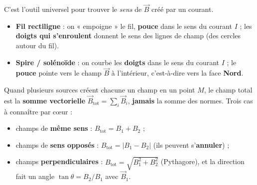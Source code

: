 \documentclass[11pt,a4paper]{article}
\newcommand{\vv}[1]{\vec{#1}}\newcommand{\ds}{\displaystyle}
\begin{document}
\begin{methode}
C'est l'outil universel pour trouver le \emph{sens} de $\vv{B}$ créé par un courant.
\begin{itemize}[leftmargin=1.5em,topsep=1pt,itemsep=1pt]
  \item \textbf{Fil rectiligne} : on « empoigne » le fil, \textbf{pouce} dans le sens du courant $I$ ;
        les \textbf{doigts qui s'enroulent} donnent le sens des lignes de champ (des cercles autour
        du fil).
  \item \textbf{Spire / solénoïde} : on courbe les \textbf{doigts} dans le sens du courant $I$ ;
        le \textbf{pouce} pointe vers le champ $\vv{B}$ à l'intérieur, c'est-à-dire vers la face
        \textbf{Nord}.
\end{itemize}
\begin{center}
\end{center}
\end{methode}

\begin{piege}
Quand plusieurs sources créent chacune un champ en un point $M$, le champ total est la
\textbf{somme vectorielle} $\vv{B}_{\text{tot}}=\sum_i \vv{B}_i$, \textbf{jamais} la somme des normes.
Trois cas à connaître par cœur :
\begin{itemize}[leftmargin=1.5em,topsep=1pt,itemsep=0pt]
  \item champs de \textbf{même sens} : $B_{\text{tot}}=B_1+B_2$ ;
  \item champs de \textbf{sens opposés} : $B_{\text{tot}}=|B_1-B_2|$ (ils peuvent s'\textbf{annuler}) ;
  \item champs \textbf{perpendiculaires} : $B_{\text{tot}}=\sqrt{B_1^{2}+B_2^{2}}$ (Pythagore),
        et la direction fait un angle $\tan\theta=B_2/B_1$ avec $\vv{B}_1$.
\end{itemize}
\end{piege}
\end{document}
